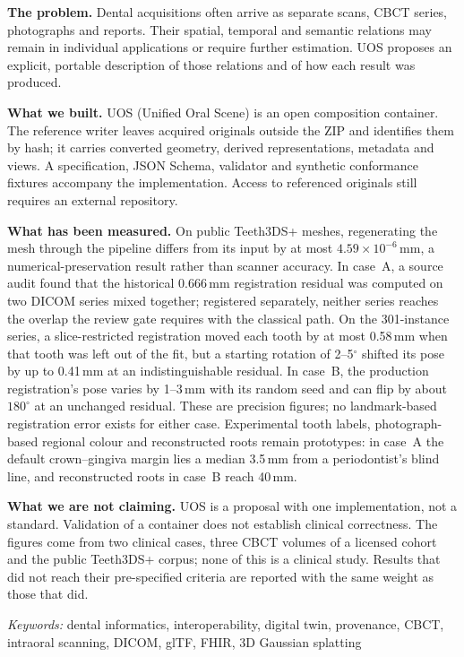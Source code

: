 \documentclass[11pt,a4paper]{article}
\begin{document}
{\small

\noindent\textbf{The problem.} Dental acquisitions often arrive as separate scans,
CBCT series, photographs and reports. Their spatial, temporal and semantic relations may
remain in individual applications or require further estimation. UOS proposes an explicit,
portable description of those relations and of how each result was produced.

\noindent\textbf{What we built.} UOS (Unified Oral Scene) is an open composition container.
The reference writer leaves acquired originals outside the ZIP and identifies them by
hash; it carries converted geometry, derived representations, metadata and views. A
specification, JSON Schema, validator and synthetic conformance fixtures accompany the
implementation. Access to referenced originals still requires an external repository.

\noindent\textbf{What has been measured.} On public Teeth3DS+ meshes, regenerating the
mesh through the pipeline differs from its input by at most $4.59\times10^{-6}$\,mm, a
numerical-preservation result rather than scanner accuracy. In case~A, a source audit found
that the historical 0.666\,mm registration residual was computed on two DICOM series mixed
together; registered separately, neither series reaches the overlap the review gate requires
with the classical path. On the 301-instance series, a slice-restricted registration moved each tooth by at most
0.58\,mm when that tooth was left out of the fit, but a starting rotation of 2--5$^\circ$
shifted its pose by up to 0.41\,mm at an indistinguishable residual. In case~B, the
production registration's pose varies by 1--3\,mm with its random seed and can flip by
about $180^\circ$ at an unchanged residual. These are precision figures; no landmark-based
registration error exists for either case. Experimental tooth labels, photograph-based regional colour and
reconstructed roots remain prototypes: in case~A the default crown--gingiva margin lies a
median 3.5\,mm from a periodontist's blind line, and reconstructed roots in case~B reach
40\,mm.

\noindent\textbf{What we are not claiming.} UOS is a proposal with one implementation, not
a standard. Validation of a container does not establish clinical correctness. The figures
come from two clinical cases, three CBCT volumes of a licensed cohort and the public
Teeth3DS+ corpus; none of this is a clinical study. Results that did not reach their
pre-specified criteria are reported with the same weight as those that did.

\vspace{0.25cm}
\noindent\emph{Keywords:} dental informatics, interoperability, digital twin, provenance,
CBCT, intraoral scanning, DICOM, glTF, FHIR, 3D Gaussian splatting
}
\end{document}
